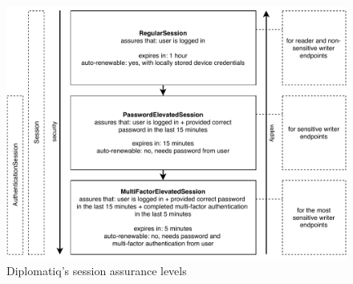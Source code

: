 \begin{figure}[!htb]
    \includegraphics[width=\textwidth]{figures/session-assurance-levels.pdf}
    \caption{Diplomatiq's session assurance levels}
    \label{fig:session-assurance-levels}
\end{figure}

